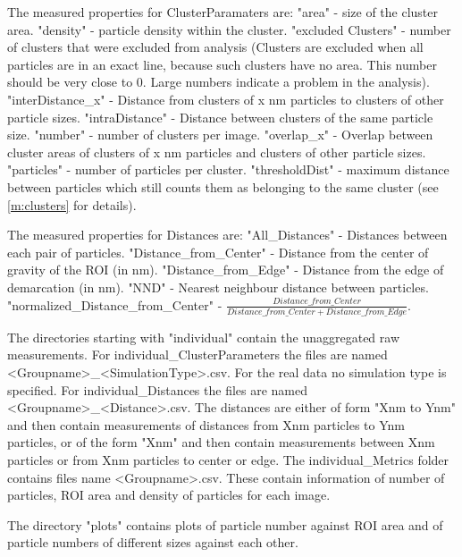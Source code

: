 \documentclass[12pt, a4paper]{scrartcl}
\begin{document}
The measured properties for ClusterParamaters are: "area" - size of the cluster area. "density" - particle density within the cluster. "excluded Clusters" - number of clusters that were excluded from analysis (Clusters are excluded when all particles are in an exact line, because such clusters have no area. This number should be very close to 0. Large numbers indicate a problem in the analysis). "interDistance\_x" - Distance from clusters of x nm particles to clusters of other particle sizes. "intraDistance" - Distance between clusters of the same particle size. "number" - number of clusters per image. "overlap\_x" - Overlap between cluster areas of clusters of x nm particles and clusters of other particle sizes. "particles" - number of particles per cluster. "thresholdDist" - maximum distance between particles which still counts them as belonging to the same cluster (see \ref{m:clusters} for details).

The measured properties for Distances are: "All\_Distances" - Distances between each pair of particles. "Distance\_from\_Center" - Distance from the center of gravity of the ROI (in nm). "Distance\_from\_Edge" - Distance from the edge of demarcation (in nm). "NND" - Nearest neighbour distance between particles. "normalized\_Distance\_from\_Center" - $ \frac{Distance\_from\_Center}{Distance\_from\_Center + Distance\_from\_Edge} $. 

The directories starting with "individual" contain the unaggregated raw measurements. For individual\_ClusterParameters the files are named <Groupname>\_<SimulationType>.csv. For the real data no simulation type is specified. For individual\_Distances the files are named <Groupname>\_<Distance>.csv. The distances are either of form "Xnm to Ynm" and then contain measurements of distances from Xnm particles to Ynm particles, or of the form "Xnm" and then contain measurements between Xnm particles or from Xnm particles to center or edge. The individual\_Metrics folder contains files name <Groupname>.csv. These contain information of number of particles, ROI area and density of particles for each image.

The directory "plots" contains plots of particle number against ROI area and of particle numbers of different sizes against each other. 
\end{document}
